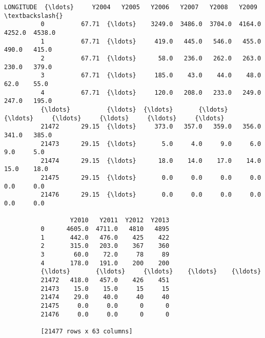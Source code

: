 \documentclass[11pt]{article}
\begin{document}
\begin{Verbatim}[commandchars=\\\{\}]
                 LONGITUDE  {\ldots}     Y2004   Y2005   Y2006   Y2007   Y2008   Y2009  \textbackslash{}
          0          67.71  {\ldots}    3249.0  3486.0  3704.0  4164.0  4252.0  4538.0   
          1          67.71  {\ldots}     419.0   445.0   546.0   455.0   490.0   415.0   
          2          67.71  {\ldots}      58.0   236.0   262.0   263.0   230.0   379.0   
          3          67.71  {\ldots}     185.0    43.0    44.0    48.0    62.0    55.0   
          4          67.71  {\ldots}     120.0   208.0   233.0   249.0   247.0   195.0   
          {\ldots}          {\ldots}  {\ldots}       {\ldots}     {\ldots}     {\ldots}     {\ldots}     {\ldots}     {\ldots}   
          21472      29.15  {\ldots}     373.0   357.0   359.0   356.0   341.0   385.0   
          21473      29.15  {\ldots}       5.0     4.0     9.0     6.0     9.0     5.0   
          21474      29.15  {\ldots}      18.0    14.0    17.0    14.0    15.0    18.0   
          21475      29.15  {\ldots}       0.0     0.0     0.0     0.0     0.0     0.0   
          21476      29.15  {\ldots}       0.0     0.0     0.0     0.0     0.0     0.0   
          
                  Y2010   Y2011  Y2012  Y2013  
          0      4605.0  4711.0   4810   4895  
          1       442.0   476.0    425    422  
          2       315.0   203.0    367    360  
          3        60.0    72.0     78     89  
          4       178.0   191.0    200    200  
          {\ldots}       {\ldots}     {\ldots}    {\ldots}    {\ldots}  
          21472   418.0   457.0    426    451  
          21473    15.0    15.0     15     15  
          21474    29.0    40.0     40     40  
          21475     0.0     0.0      0      0  
          21476     0.0     0.0      0      0  
          
          [21477 rows x 63 columns]
\end{Verbatim}
            
\end{document}
